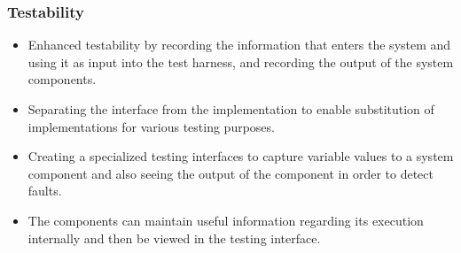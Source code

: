 \subsubsection{Testability}
	\begin{itemize}
		\item Enhanced testability by recording the information that enters the system and using it as input into the test harness, and recording the output of the system components.
		\item Separating the interface from the implementation to enable substitution of implementations for various testing purposes.
		\item Creating a specialized testing interfaces to capture variable values to a system component and also seeing the output of the component in order to detect faults.
		\item The components can maintain useful information regarding its execution internally and then be viewed in the testing interface.
	\end{itemize}